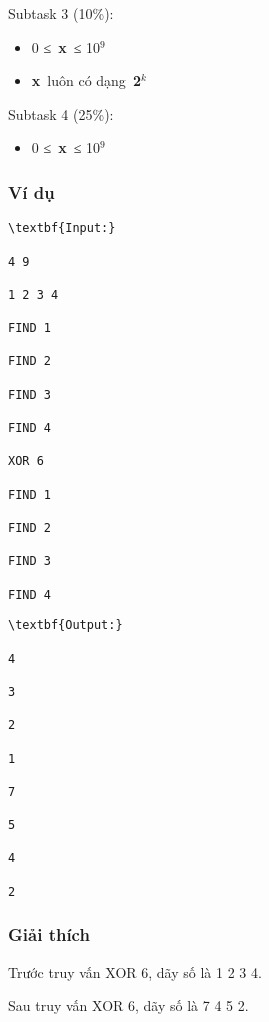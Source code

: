 Subtask 3 (10\%):
\begin{itemize}
	\item 0 ≤ \textbf{x} ≤ 10$^9$
	\item \textbf{x} luôn có dạng \textbf{2$^k$}
\end{itemize}

Subtask 4 (25\%):
\begin{itemize}
	\item 0 ≤ \textbf{x} ≤ 10$^9$
\end{itemize}

\subsubsection{Ví dụ}
\begin{verbatim}
\textbf{Input:}

4 9

1 2 3 4

FIND 1

FIND 2

FIND 3

FIND 4

XOR 6

FIND 1

FIND 2

FIND 3

FIND 4\end{verbatim}
\begin{verbatim}
\textbf{Output:}

4

3

2

1

7

5

4

2

\end{verbatim}

\subsubsection{Giải thích}

Trước truy vấn XOR 6, dãy số là 1 2 3 4.

Sau truy vấn XOR 6, dãy số là 7 4 5 2.
